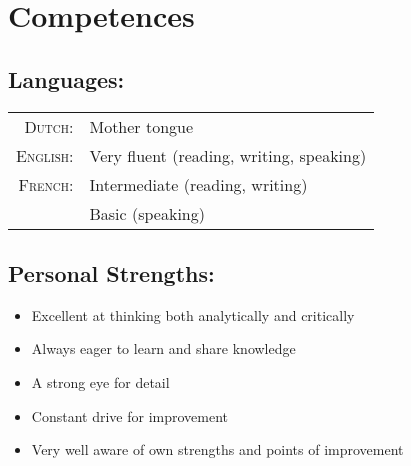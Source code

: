 \documentclass[a4paper,10pt]{article}
\begin{document}
\section{\textcolor{awesome-red}{Com}petences}

\subsection{Languages:}
\begin{tabular}{rl}
\textsc{Dutch:}&Mother tongue\\
\textsc{English:}&Very fluent (reading, writing, speaking)\\
\textsc{French:}&Intermediate (reading, writing) \\ & Basic (speaking)\\
\end{tabular}

\subsection{Personal Strengths:}
\begin{itemize}
\item Excellent at thinking both analytically and critically
\item Always eager to learn and share knowledge
\item A strong eye for detail
\item Constant drive for improvement
\item Very well aware of own strengths and points of improvement
\end{itemize}
\end{document}
